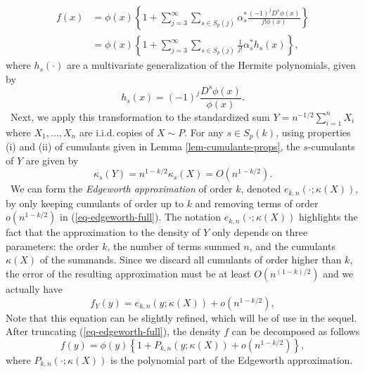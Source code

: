 \begin{align}
    f(x) 
    &= \phi(x) \left\{ 1 + \sum_{j=3}^\infty 
    \sum_{s \in S_p(j)}
    \alpha^*_s \frac{(-1)^j D^s \phi(x)}{j! \phi(x)}\right\} \nonumber \\
    &= \phi(x) \left\{
        1 + \sum_{j=3}^\infty  \sum_{s \in S_p(j)} \frac{1}{j!}\alpha^*_s h_s(x)
    \right\}, \label{eq-edgeworth-full}
\end{align} 
where $h_s(\cdot)$ are a multivariate generalization of the Hermite polynomials, given by
\begin{equation} \label{eq-hermite}
    h_s(x) = (-1)^j \frac{D^s \phi(x)}{\phi(x)}.
\end{equation}
\
Next, we apply this transformation to the standardized sum $Y = n^{-1/2}\sum_{i=1}^n X_i$ where $X_1, \ldots, X_n$ are i.i.d.\,copies of $X \sim P$. For any $s \in S_p(k)$, using properties (i) and (ii) of cumulants given in Lemma \ref{lem-cumulants-props}, the $s$-cumulants of $Y$ are given by 
\begin{equation*}
    \kappa_s(Y) = n^{1-k/2} \kappa_s(X) = O(n^{1-k/2}).
\end{equation*}
\
We can form the \textit{Edgeworth approximation} of order $k$, denoted $e_{k, n}(\cdot; \kappa(X))$, by only keeping cumulants of order up to $k$ and removing terms of order $o(n^{1-k/2})$ in (\ref{eq-edgeworth-full}). The notation $e_{k, n}(\cdot; \kappa(X))$ highlights the fact that the approximation to the density of $Y$ only depends on three parameters: the order $k$, the number of terms summed $n$, and the cumulants $\kappa(X)$ of the summands. Since we discard all cumulants of order higher than $k$, the error of the resulting approximation must be at least $O(n^{(1-k)/2})$ and we actually have
\begin{equation} \label{eq-edgeworth}
    f_Y(y) = e_{k, n}(y; \kappa(X)) + o(n^{1-k/2}),
\end{equation}
Note that this equation can be slightly refined, which will be of use in the sequel. After truncating (\ref{eq-edgeworth-full}), the density $f$ can be decomposed as follows
\begin{equation} \label{eq-edge-polynomial}
    f(y) = \phi(y)\left\{1 + P_{k, n}(y; \kappa(X)) + o(n^{1-k/2})\right\},
\end{equation}
where $P_{k, n}(\cdot; \kappa(X))$ is the polynomial part of the Edgeworth approximation.

